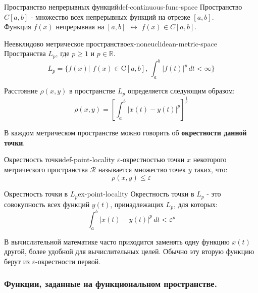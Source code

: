\documentclass[14pt]{extarticle}
\begin{document}
        \begin{definition}{Пространство непрерывных функций}{def-continuous-func-space}
            Пространство $C[a, b]$ - множество всех непрерывных функций на отрезке $[a, b]$.\\
            Функция $f(x)$ непрерывная на $[a, b]$ $\leftrightarrow$ $f(x) \in C[a, b]$.
        \end{definition}

        \begin{example}{Неевклидово метрическое пространство}{ex-noneuclidean-metric-space}
            Пространства $L_{p}$, где $p \geq 1$ и $p \in \mathbb{R}$.
            $$L_{p} = \{f(x) \text{| } f(x) \in \text{C}[a, b] \text{, } \int_{a}^{b}|f(t)|^{p} \, dt < \infty\}$$

            Расстояние $\rho(x, y)$ в пространстве $L_{p}$ определяется следующим образом:
            $$\rho(x, y) = [\int_{a}^{b}|x(t) - y(t)|^{p}]^{\frac{1}{p}}$$
        \end{example}

        В каждом метрическом пространстве можно говорить об \textbf{окрестности данной точки}.

        \begin{definition}{Окрестность точки}{def-point-locality}
            $\varepsilon$-окрестностью точки $x$ некоторого метрического пространства $\mathscr{R}$ называется множество точек $y$ таких, что:
            $$\rho(x, y) \leq \varepsilon$$
        \end{definition}

        \begin{example}{Окрестность точки в $L_{p}$}{ex-point-locality}
            Окрестность точки в $L_{p}$ - это совокупность всех функций $y(t)$, принадлежащих $L_{p}$, для которых:
            $$\int_{a}^{b} |x(t) - y(t)|^{p} \, dt < \varepsilon^{p}$$
        \end{example}

        В вычислительной математике часто приходится заменять одну функцию $x(t)$ другой, более удобной для вычислительных целей. Обычно эту вторую функцию берут из $\varepsilon$-окрестности первой.

    \subsubsection{Функции, заданные на функциональном пространстве.}
        
\end{document}
